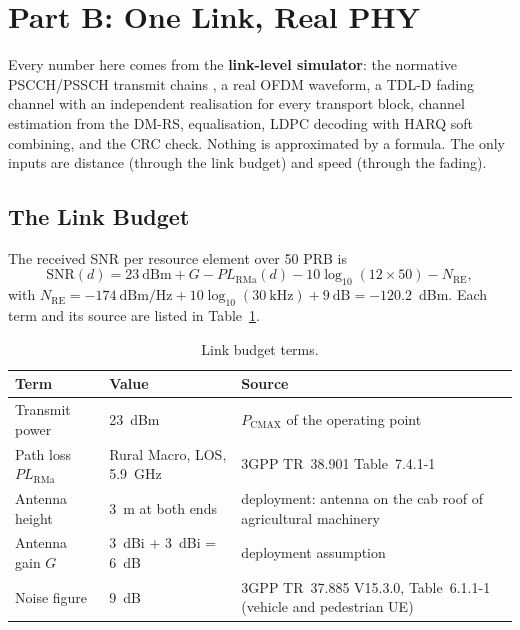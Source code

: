 \documentclass{article}
\begin{document}
\newpage
\section{Part B: One Link, Real PHY}
\label{sec:partB}

Every number here comes from the \textbf{link-level simulator}: the
normative PSCCH/PSSCH transmit chains \cite{ref:38211,ref:38212}, a real
OFDM waveform, a TDL-D fading channel with an independent realisation
for every transport block, channel estimation from the DM-RS,
equalisation, LDPC decoding with HARQ soft combining, and the CRC check.
Nothing is approximated by a formula. The only inputs are distance
(through the link budget) and speed (through the fading).

\subsection{The Link Budget}
\label{sec:budget}

The received SNR per resource element over 50 PRB is
\begin{equation}
\label{eq:snr}
\mathrm{SNR}(d) = 23~\text{dBm} + G - PL_{\mathrm{RMa}}(d) - 10\log_{10}(12 \times 50) - N_{\mathrm{RE}},
\end{equation}
with $N_{\mathrm{RE}} = -174~\text{dBm/Hz} + 10\log_{10}(30~\text{kHz}) + 9~\text{dB} = -120.2$~dBm.
Each term and its source are listed in Table~\ref{tab:budget}.

\begin{table}[H]
\centering
\caption{Link budget terms.}
\label{tab:budget}
\small
\begin{tabularx}{\textwidth}{l l X}
\toprule
\textbf{Term} & \textbf{Value} & \textbf{Source} \\
\midrule
Transmit power & 23~dBm & $P_{\mathrm{CMAX}}$ of the operating point \\
Path loss $PL_{\mathrm{RMa}}$ & Rural Macro, LOS, 5.9~GHz & 3GPP TR~38.901 Table~7.4.1-1 \cite{ref:38901} \\
Antenna height & 3~m at both ends & deployment: antenna on the cab roof of agricultural machinery \\
Antenna gain $G$ & 3~dBi + 3~dBi = 6~dB & deployment assumption \\
Noise figure & 9~dB & 3GPP TR~37.885 V15.3.0, Table~6.1.1-1 (vehicle and pedestrian UE) \cite{ref:37885} \\
\bottomrule
\end{tabularx}
\end{table}
\end{document}
